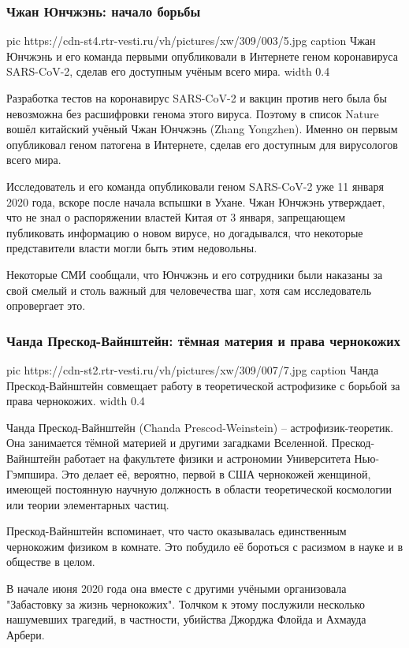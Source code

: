\subsubsection{Чжан Юнчжэнь: начало борьбы}

\ifcmt
  pic https://cdn-st4.rtr-vesti.ru/vh/pictures/xw/309/003/5.jpg
	caption Чжан Юнчжэнь и его команда первыми опубликовали в Интернете геном коронавируса SARS-CoV-2, сделав его доступным учёным всего мира.
  width 0.4
\fi

Разработка тестов на коронавирус SARS-CoV-2 и вакцин против него была бы
невозможна без расшифровки генома этого вируса. Поэтому в список Nature вошёл
китайский учёный Чжан Юнчжэнь (Zhang Yongzhen). Именно он первым опубликовал
геном патогена в Интернете, сделав его доступным для вирусологов всего мира.

Исследователь и его команда опубликовали геном SARS-CoV-2 уже 11 января 2020
года, вскоре после начала вспышки в Ухане. Чжан Юнчжэнь утверждает, что не знал
о распоряжении властей Китая от 3 января, запрещающем публиковать информацию о
новом вирусе, но догадывался, что некоторые представители власти могли быть
этим недовольны.

Некоторые СМИ сообщали, что Юнчжэнь и его сотрудники были наказаны за свой
смелый и столь важный для человечества шаг, хотя сам исследователь опровергает
это.

\subsubsection{Чанда Прескод-Вайнштейн: тёмная материя и права чернокожих}


\ifcmt
  pic https://cdn-st2.rtr-vesti.ru/vh/pictures/xw/309/007/7.jpg
	caption Чанда Прескод-Вайнштейн совмещает работу в теоретической астрофизике с борьбой за права чернокожих.
  width 0.4
\fi

Чанда Прескод-Вайнштейн (Chanda Prescod-Weinstein) – астрофизик-теоретик. Она
занимается тёмной материей и другими загадками Вселенной. Прескод-Вайнштейн
работает на факультете физики и астрономии Университета Нью-Гэмпшира. Это
делает её, вероятно, первой в США чернокожей женщиной, имеющей постоянную
научную должность в области теоретической космологии или теории элементарных
частиц.

Прескод-Вайнштейн вспоминает, что часто оказывалась единственным чернокожим
физиком в комнате. Это побудило её бороться с расизмом в науке и в обществе в
целом.

В начале июня 2020 года она вместе с другими учёными организовала "Забастовку
за жизнь чернокожих". Толчком к этому послужили несколько нашумевших трагедий,
в частности, убийства Джорджа Флойда и Ахмауда Арбери.

